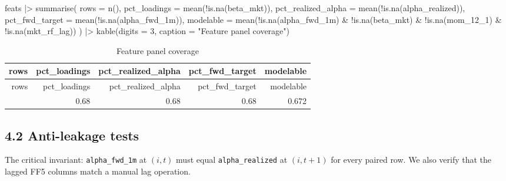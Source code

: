 \documentclass[
  letterpaper,
  DIV=11,
  numbers=noendperiod]{scrartcl}
\newenvironment{Shaded}{\begin{snugshade}}{\end{snugshade}}
\newcommand{\AttributeTok}[1]{\textcolor[rgb]{0.40,0.45,0.13}{#1}}
\newcommand{\DecValTok}[1]{\textcolor[rgb]{0.68,0.00,0.00}{#1}}
\newcommand{\FunctionTok}[1]{\textcolor[rgb]{0.28,0.35,0.67}{#1}}
\newcommand{\NormalTok}[1]{\textcolor[rgb]{0.00,0.23,0.31}{#1}}
\newcommand{\SpecialCharTok}[1]{\textcolor[rgb]{0.37,0.37,0.37}{#1}}
\newcommand{\StringTok}[1]{\textcolor[rgb]{0.13,0.47,0.30}{#1}}
\begin{document}
\begin{Shaded}
\begin{Highlighting}[]
\NormalTok{feats }\SpecialCharTok{|\textgreater{}}
  \FunctionTok{summarise}\NormalTok{(}
    \AttributeTok{rows =} \FunctionTok{n}\NormalTok{(),}
    \AttributeTok{pct\_loadings       =} \FunctionTok{mean}\NormalTok{(}\SpecialCharTok{!}\FunctionTok{is.na}\NormalTok{(beta\_mkt)),}
    \AttributeTok{pct\_realized\_alpha =} \FunctionTok{mean}\NormalTok{(}\SpecialCharTok{!}\FunctionTok{is.na}\NormalTok{(alpha\_realized)),}
    \AttributeTok{pct\_fwd\_target     =} \FunctionTok{mean}\NormalTok{(}\SpecialCharTok{!}\FunctionTok{is.na}\NormalTok{(alpha\_fwd\_1m)),}
    \AttributeTok{modelable          =} \FunctionTok{mean}\NormalTok{(}\SpecialCharTok{!}\FunctionTok{is.na}\NormalTok{(alpha\_fwd\_1m) }\SpecialCharTok{\&} \SpecialCharTok{!}\FunctionTok{is.na}\NormalTok{(beta\_mkt) }\SpecialCharTok{\&}
                              \SpecialCharTok{!}\FunctionTok{is.na}\NormalTok{(mom\_12\_1) }\SpecialCharTok{\&} \SpecialCharTok{!}\FunctionTok{is.na}\NormalTok{(mkt\_rf\_lag))}
\NormalTok{  ) }\SpecialCharTok{|\textgreater{}}
  \FunctionTok{kable}\NormalTok{(}\AttributeTok{digits =} \DecValTok{3}\NormalTok{, }\AttributeTok{caption =} \StringTok{"Feature panel coverage"}\NormalTok{)}
\end{Highlighting}
\end{Shaded}

\begin{longtable}[]{@{}rrrrr@{}}
\caption{Feature panel coverage}\tabularnewline
\toprule\noalign{}
rows & pct\_loadings & pct\_realized\_alpha & pct\_fwd\_target &
modelable \\
\midrule\noalign{}
\endfirsthead
\toprule\noalign{}
rows & pct\_loadings & pct\_realized\_alpha & pct\_fwd\_target &
modelable \\
\midrule\noalign{}
\endhead
\bottomrule\noalign{}
\endlastfoot
52221 & 0.68 & 0.68 & 0.68 & 0.672 \\
\end{longtable}

\subsection{4.2 Anti-leakage tests}\label{anti-leakage-tests}

The critical invariant: \texttt{alpha\_fwd\_1m} at \((i, t)\) must equal
\texttt{alpha\_realized} at \((i, t+1)\) for every paired row. We also
verify that the lagged FF5 columns match a manual lag operation.
\end{document}
